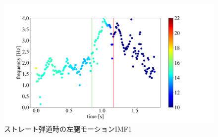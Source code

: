 

\begin{figure}
    \centering
    \includegraphics[width=1.0\linewidth]{./images/straight_data/left_up_leg/IMF4.png}
    \caption{ストレート弾道時の左腿モーションIMF1}
    \label{straight left up leg imf4}
\end{figure}

